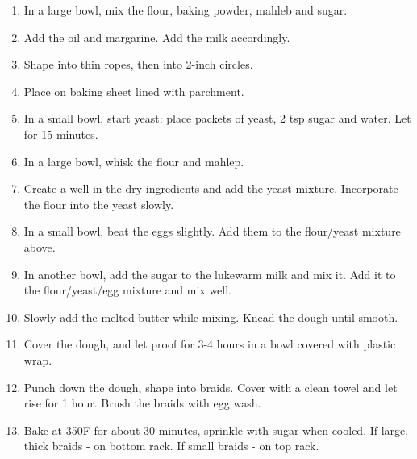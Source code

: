 \begin{enumerate}
    \item In a large bowl, mix the flour, baking powder, mahleb and sugar.
    \item Add the oil and margarine. Add the milk accordingly.
    \item Shape into thin ropes, then into 2-inch circles.
    \item Place on baking sheet lined with parchment.
    \item In a small bowl, start yeast: place packets of yeast, 2 tsp sugar and water. Let for 15 minutes.
    \item In a large bowl, whisk the flour and mahlep. 
    \item Create a well in the dry ingredients and add the yeast mixture. Incorporate the flour into the yeast slowly.
    \item In a small bowl, beat the eggs slightly. Add them to the flour/yeast mixture above.
    \item In another bowl, add the sugar to the lukewarm milk and mix it. Add it to the flour/yeast/egg mixture and mix well.
    \item Slowly add the melted butter while mixing. Knead the dough until smooth.
    \item Cover the dough, and let proof for 3-4 hours in a bowl covered with plastic wrap.
    \item Punch down the dough, shape into braids. Cover with a clean towel and let rise for 1 hour. Brush the braids with egg wash.
    \item Bake at 350\degree F for about 30 minutes, sprinkle with sugar when cooled.
    If large, thick braids - on bottom rack.
    If small braids - on top rack.
\end{enumerate}